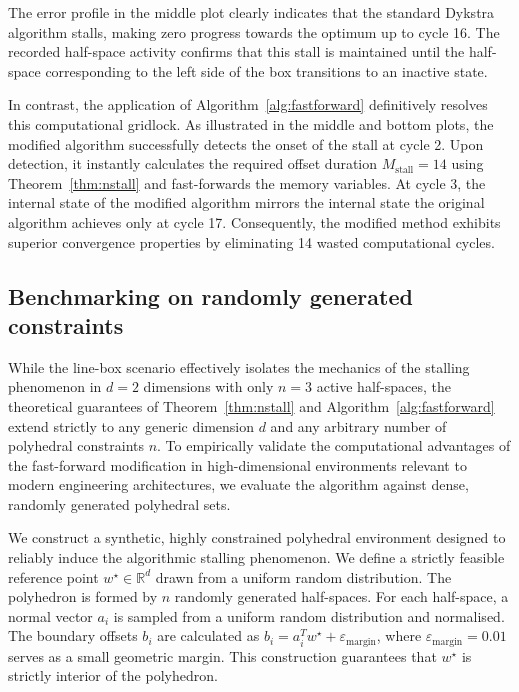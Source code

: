 The error profile in the middle plot clearly indicates that the standard Dykstra algorithm stalls, making zero progress towards the optimum up to cycle 16. The recorded half-space activity confirms that this stall is maintained until the half-space corresponding to the left side of the box transitions to an inactive state.

In contrast, the application of Algorithm~\ref{alg:fastforward} definitively resolves this computational gridlock. As illustrated in the middle and bottom plots, the modified algorithm successfully detects the onset of the stall at cycle 2. Upon detection, it instantly calculates the required offset duration $M_\text{stall} = 14$ using Theorem~\ref{thm:nstall} and fast-forwards the memory variables. At cycle 3, the internal state of the modified algorithm mirrors the internal state the original algorithm achieves only at cycle 17. Consequently, the modified method exhibits superior convergence properties by eliminating 14 wasted computational cycles.

\subsection{Benchmarking on randomly generated constraints} \label{subsec:randomly_generated_constraints}

While the line-box scenario effectively isolates the mechanics of the stalling phenomenon in $d=2$ dimensions with only $n=3$ active half-spaces, the theoretical guarantees of Theorem~\ref{thm:nstall} and Algorithm~\ref{alg:fastforward} extend strictly to any generic dimension $d$ and any arbitrary number of polyhedral constraints $n$. To empirically validate the computational advantages of the fast-forward modification in high-dimensional environments relevant to modern engineering architectures, we evaluate the algorithm against dense, randomly generated polyhedral sets.

We construct a synthetic, highly constrained polyhedral environment designed to reliably induce the algorithmic stalling phenomenon. We define a strictly feasible reference point $w^\star \in \mathbb{R}^d$ drawn from a uniform random distribution. The polyhedron is formed by $n$ randomly generated half-spaces. For each half-space, a normal vector $a_i$ is sampled from a uniform random distribution and normalised. The boundary offsets $b_i$ are calculated as $b_i = a_i^T w^\star + \varepsilon_\text{margin}$, where $\varepsilon_\text{margin} = 0.01$ serves as a small geometric margin. This construction guarantees that $w^\star$ is strictly interior of the polyhedron. 

